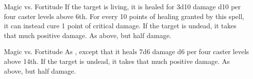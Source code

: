 \begin{spellheader}
    \spellrng{\rngclose}
\end{spellheader}
\begin{spelleffects}
    \begin{spellattack}{Magic vs. Fortitude}
        \spelleffect If the target is living, it is healed for 3d10 damage \add d10 per four caster levels above 6th. For every 10 points of healing granted by this spell, it can instead cure 1 point of critical damage.
        \spellsuccess If the target is undead, it takes that much positive damage.
        \spellfailure As above, but half damage.
    \end{spellattack}
\end{spelleffects}
\begin{spellfooter}

\end{spellfooter}

\begin{spellheader}
\end{spellheader}
\begin{spelleffects}
    \begin{spellattack}{Magic vs. Fortitude}
        \spelleffect As , except that it heals 7d6 damage \add d6 per four caster levels above 14th.
        \spellsuccess If the target is undead, it takes that much positive damage.
        \spellfailure As above, but half damage.
    \end{spellattack}
\end{spelleffects}
\begin{spellfooter}

\end{spellfooter}

\begin{comment}
\subsubsection{D}
\end{comment}

